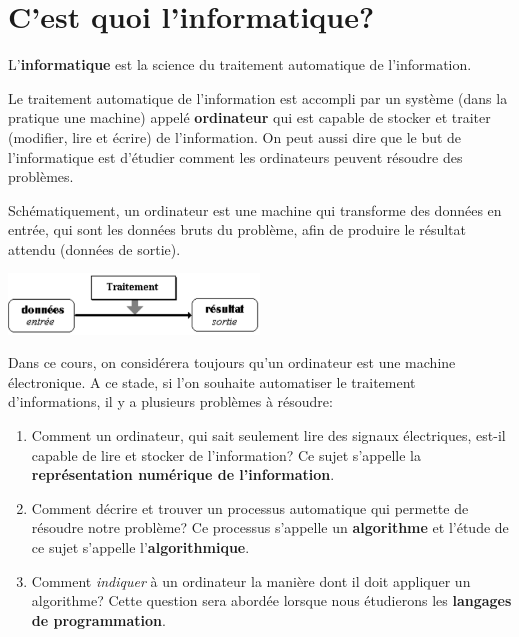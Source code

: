 

\section{C'est quoi l'informatique?}
\begin{mydefinition}
	L'\textbf{informatique} est la science du traitement automatique de l’information.
\end{mydefinition}
Le traitement automatique de l’information est accompli par un système (dans la pratique une machine) appelé \textbf{ordinateur} qui est capable de stocker et traiter (modifier, lire et écrire) de l'information. On peut aussi dire que le but de l'informatique est d'étudier comment les ordinateurs peuvent résoudre des problèmes.

Schématiquement, un ordinateur est une machine qui transforme des données en entrée, qui sont les données bruts du problème, afin de produire le résultat attendu (données de sortie).
\begin{center}
	\includegraphics[trim=0 0 0 20,width=0.5\textwidth]{Images/shema_science_info}
\end{center}
Dans ce cours, on considérera toujours qu'un ordinateur est une machine électronique. A ce stade, si l'on souhaite automatiser le traitement d'informations, il y a plusieurs problèmes à résoudre:
\begin{enumerate}
	\item Comment un ordinateur, qui sait seulement lire des signaux électriques, est-il capable de lire et stocker de l'information? Ce sujet s'appelle la \textbf{représentation numérique de l'information}.
	\item Comment décrire et trouver un processus automatique qui permette de résoudre notre problème?
	Ce processus s'appelle un \textbf{algorithme} et l'étude de ce sujet s'appelle l'\textbf{algorithmique}.
	\item Comment \textit{indiquer} à un ordinateur la manière dont il doit appliquer un algorithme? Cette question sera abordée lorsque nous étudierons les \textbf{langages de programmation}.
\end{enumerate}

